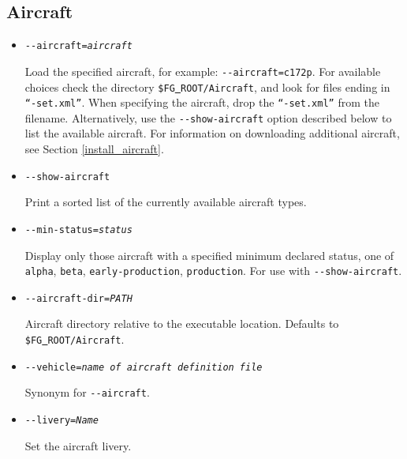 {
  \subsection{Aircraft}

  \begin{itemize}
  \item{\texttt{-$ $-aircraft={\it aircraft}}}

  Load the specified aircraft, for example: \texttt{-$ $-aircraft=c172p}. For available choices
  check the directory \texttt{\$FG\underline{~}ROOT/Aircraft}, and look for files ending in \texttt{``-set.xml''}.
  When specifying the aircraft, drop the \texttt{``-set.xml''} from the filename. Alternatively, use
  the \texttt{-$ $-show-aircraft} option described below to list the available aircraft. For information
  on downloading additional aircraft, see Section \ref{install_aircraft}.

  \item{\texttt{-$ $-show-aircraft}}

  Print a sorted list of the currently available aircraft types.

  \item{\texttt{-$ $-min-status={\it status}}}

  Display only those aircraft with a specified minimum declared status, one of
  \texttt{alpha}, \texttt{beta}, \texttt{early-production}, \texttt{production}. For use with \texttt{-$ $-show-aircraft}.

  \item{\texttt{-$ $-aircraft-dir={\it PATH}}}

  Aircraft directory relative to the executable location. Defaults to \texttt{\$FG\underline{~}ROOT/Aircraft}.

  \item{\texttt{-$ $-vehicle={\it name of aircraft definition file}}}

  Synonym for \texttt{-$ $-aircraft}.

  \item{\texttt{-$ $-livery={\it Name}}}

  Set the aircraft livery.

  \end{itemize}
}

